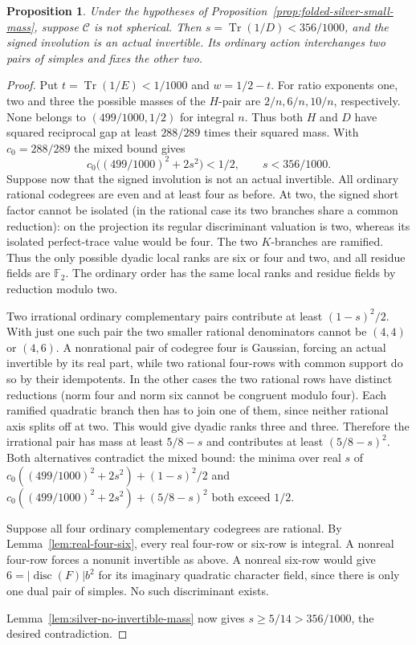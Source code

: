 \documentclass[11pt,reqno]{amsart}
\newtheorem{proposition}[theorem]{Proposition}
\theoremstyle{remark}\newtheorem{remark}[theorem]{Remark}
\numberwithin{equation}{section}
\begin{document}
\begin{proposition}\label{prop:folded-silver-actual}
Under the hypotheses of Proposition~\ref{prop:folded-silver-small-mass},
suppose $\mathcal C$ is not spherical. Then
$s=\operatorname{Tr}(1/D)<356/1000$, and the signed involution
is an actual invertible. Its ordinary action interchanges two pairs
of simples and fixes the other two.
\end{proposition}
\begin{proof}
Put $t=\operatorname{Tr}(1/E)<1/1000$ and $w=1/2-t$.
For ratio exponents one, two and three the possible masses of the
$H$-pair are $2/n,6/n,10/n$, respectively. None belongs to
$(499/1000,1/2)$ for integral $n$. Thus both $H$ and $D$ have
squared reciprocal gap at least $288/289$ times their squared mass.
With $c_0=288/289$ the mixed bound gives
\[
      c_0\bigl((499/1000)^2+2s^2\bigr)<1/2,\qquad s<356/1000.
\]
Suppose now that the signed involution is not an actual invertible.
All ordinary rational codegrees are even and at least four as before. At two, the signed short factor cannot be isolated (in the rational case its two branches share a common reduction): on the projection its regular discriminant valuation is two, whereas its isolated perfect-trace value would be four. The two $K$-branches are ramified. Thus the only possible dyadic local ranks are six or four and two, and all residue fields are $\mathbb F_2$. The ordinary order has the same local ranks and residue fields by reduction modulo two.

Two irrational ordinary complementary pairs contribute at least $(1-s)^2/2$. With just one such pair the two smaller rational denominators cannot be $(4,4)$ or $(4,6)$. A nonrational pair of codegree four is Gaussian, forcing an actual invertible by its real part, while two rational four-rows with common support do so by their idempotents. In the other cases the two rational rows have distinct reductions (norm four and norm six cannot be congruent modulo four). Each ramified quadratic branch then has to join one of them, since neither rational axis splits off at two. This would give dyadic ranks three and three. Therefore the irrational pair has mass at least $5/8-s$ and contributes at least $(5/8-s)^2$. Both alternatives contradict the mixed bound: the minima over real $s$ of $c_0((499/1000)^2+2s^2)+(1-s)^2/2$ and $c_0((499/1000)^2+2s^2)+(5/8-s)^2$ both exceed $1/2$.

Suppose all four ordinary complementary codegrees are rational. By Lemma~\ref{lem:real-four-six}, every real four-row or six-row
is integral. A nonreal four-row forces a nonunit invertible as
above. A nonreal six-row would give $6=|\operatorname{disc}(F)|b^2$
for its imaginary quadratic character field, since there is only
one dual pair of simples. No such discriminant exists.

Lemma~\ref{lem:silver-no-invertible-mass} now gives
$s\ge5/14>356/1000$, the desired contradiction.
\end{proof}
\end{document}

